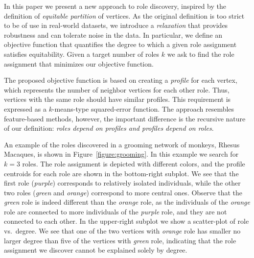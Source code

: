\iffalse
An attractive definition for 
discovering roles in networks is based on the concept of
\emph{regular equivalence}~\cite{everett1994regular,white1983graph}:
According to regular equivalence, 
two vertices should be assigned to the same role
only if their neighbors have the same roles, ignoring multiplicities.
For example, 
for the collaboration network of a company
we may discover 
that vertices with role $A$ (``project manager'')
are connected to vertices with role 
$B$ (``business analyst'') and $C$ (``s/w developer''), 
while vertices with roles $B$ and $C$ are typically not connected to each other. 
\fi

In this paper we present a new approach to role discovery, 
inspired by the definition of \emph{equitable partition} of vertices.
As the original definition is too strict to be of use in real-world datasets, 
we introduce a \emph{relaxation} that provides robustness and can tolerate noise in the data.
In particular, we define an objective function that quantifies
the degree to which a given role assignment 
satisfies equitability.
Given a target number of roles $k$
we ask to find the role assignment that minimizes our objective function.



The proposed objective function is based on creating a \emph{profile} for each vertex, 
which represents the number of neighbor vertices for each other role.
Thus, vertices with the same role should have similar profiles.
This requirement is expressed as a $k$-means-type squared-error function. 
The approach resembles feature-based methods,
however, the important difference is the recursive nature of our definition: 
\emph{roles depend on profiles and profiles depend on roles}. 

An example of the roles discovered in a grooming network
of monkeys, Rhesus Macaques, 
is shown in Figure~\ref{figure:grooming}. 
In this example we search for $k=3$ roles. 
The role assignment is depicted with different colors, 
and the profile centroids for each role are shown in the bottom-right subplot.
We see that the first role ({\em purple}) corresponds to relatively isolated individuals, 
while the other two roles ({\em green} and {\em orange}) correspond to more central ones. 
Observe that the {\em green} role is indeed different than the {\em orange} role,
as the individuals of the {\em orange} role are connected to more individuals of the {\em purple} role, 
and they are not connected to each other. 
In the upper-right subplot we show a scatter-plot of role vs.\ degree. 
We see that one of the two vertices with {\em orange} role
has smaller no larger degree than five of the vertices with {\em green} role, 
indicating that the role assignment we discover cannot be explained solely by degree. 

